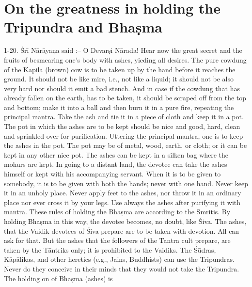\chapter{On the greatness in holding the Tripundra and Bha\d{s}ma}

1-20. \'Sr\={\i} N\=ar\=aya\d{n}a said :-- O Devar\d{s}i N\=arada! Hear now the great secret and the fruits of besmearing one's body with ashes, yieding all desires. The pure cowdung of the Kapila (brown) cow is to be taken up by the hand before it reaches the ground. It should not be like mire, i.e., not like a liquid; it should not be also very hard nor should it emit a bad stench. And in case if the cowdung that has already fallen on the earth, has to be taken, it should be scraped off from the top and bottom; make it into a ball and then burn it in a pure fire, repeating the principal mantra. Take the ash and tie it in a piece of cloth and keep it in a pot. The pot in which the ashes are to be kept should be nice and good, hard, clean and sprinkled over for purification. Uttering the principal mantra, one is to keep the ashes in the pot. The pot may be of metal, wood, earth, or cloth; or it can be kept in any other nice pot. The ashes can be kept in a silken bag where the mohurs are kept. In going to a distant land, the devotee can take the ashes himself or kept with his accompanying servant. When it is to be given to somebody, it is to be given with both the hands; never with one hand. Never keep it in an unholy place. Never apply feet to the ashes, nor throw it in an ordinary place nor ever cross it by your legs. Use always the ashes after purifying it with mantra. These rules of holding the Bha\d{s}ma are according to the Smritis. By holding Bha\d{s}ma in this way, the devotee becomes, no doubt, like \'Siva. The ashes, that the Vaidik devotees of \'Siva prepare are to be taken with devotion. All can ask for that. But the ashes that the followers of the Tantra cult prepare, are taken by the T\=antriks only; it is prohibited to the Vaidiks. The \'S\=udras, K\=ap\=alikas, and other heretics (e.g., Jains, Buddhists) can use the Tripundras. Never do they conceive in their minds that they would not take the Tripundra. The holding on of Bha\d{s}ma (ashes) is

